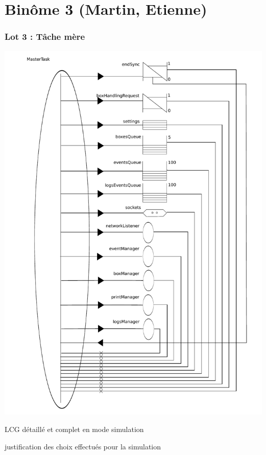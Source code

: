 \documentclass{beamer}
\begin{document}
\section{Binôme 3 (Martin, Etienne)}
	\begin{frame}
	\begin{center}
		\frametitle{Lot 3 : Tâche mère}
		\includegraphics[height=0.8\textheight]{../../SchemasLCG/masterTask.pdf}
	\end{center}
	\end{frame}

	\begin{frame}
		LCG détaillé et complet en mode simulation
	\end{frame}

	\begin{frame}
		justification des choix effectués pour la simulation 
	\end{frame}
\end{document}
